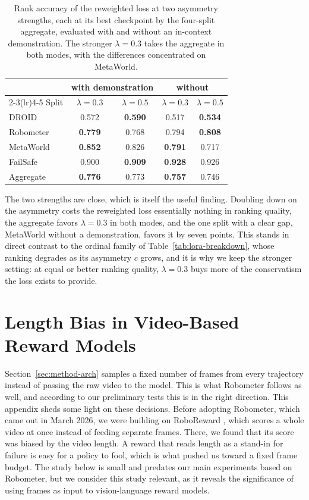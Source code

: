 \begin{table}[h]
\centering\footnotesize
\caption[Choosing the asymmetry strength]{Rank accuracy of the reweighted loss at two asymmetry strengths, each at its best checkpoint by the four-split aggregate, evaluated with and without an in-context demonstration. The stronger $\lambda = 0.3$ takes the aggregate in both modes, with the differences concentrated on MetaWorld.}
\label{tab:lambda-sweep}
\begin{tabular}{@{}lcccc@{}}
\toprule
 & \multicolumn{2}{c}{with demonstration} & \multicolumn{2}{c}{without} \\
\cmidrule(lr){2-3}\cmidrule(lr){4-5}
Split & $\lambda=0.3$ & $\lambda=0.5$ & $\lambda=0.3$ & $\lambda=0.5$ \\
\midrule
DROID & 0.572 & \textbf{0.590} & 0.517 & \textbf{0.534} \\
Robometer & \textbf{0.779} & 0.768 & 0.794 & \textbf{0.808} \\
MetaWorld & \textbf{0.852} & 0.826 & \textbf{0.791} & 0.717 \\
FailSafe & 0.900 & \textbf{0.909} & \textbf{0.928} & 0.926 \\
\midrule
Aggregate & \textbf{0.776} & 0.773 & \textbf{0.757} & 0.746 \\
\bottomrule
\end{tabular}
\end{table}

The two strengths are close, which is itself the useful finding. Doubling down on the asymmetry costs the reweighted loss essentially nothing in ranking quality, the aggregate favors $\lambda = 0.3$ in both modes, and the one split with a clear gap, MetaWorld without a demonstration, favors it by seven points. This stands in direct contrast to the ordinal family of Table~\ref{tab:lora-breakdown}, whose ranking degrades as its asymmetry $c$ grows, and it is why we keep the stronger setting: at equal or better ranking quality, $\lambda = 0.3$ buys more of the conservatism the loss exists to provide.

\chapter{Length Bias in Video-Based Reward Models}
\label{apx:length-bias}

Section~\ref{sec:method-arch} samples a fixed number of frames from every trajectory instead of passing the raw video to the model. This is what Robometer follows as well, and according to our preliminary tests this is in the right direction. This appendix sheds some light on these decisions. Before adopting Robometer, which came out in March 2026, we were building on RoboReward \citep{roboreward}, which scores a whole video at once instead of feeding separate frames. There, we found that its score was biased by the video length. A reward that reads length as a stand-in for failure is easy for a policy to fool, which is what pushed us toward a fixed frame budget. The study below is small and predates our main experiments based on Robometer, but we consider this study relevant, as it reveals the significance of using frames as input to vision-language reward models.

